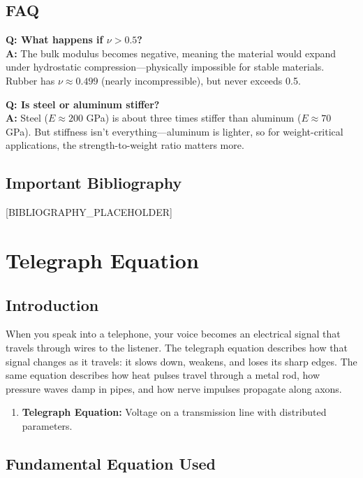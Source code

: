 \documentclass[11pt,openright]{book}
\begin{document}
\section*{FAQ}

\textbf{Q: What happens if $\nu > 0.5$?}\\
\textbf{A:} The bulk modulus becomes negative, meaning the material would expand under hydrostatic compression---physically impossible for stable materials. Rubber has $\nu \approx 0.499$ (nearly incompressible), but never exceeds 0.5.

\textbf{Q: Is steel or aluminum stiffer?}\\
\textbf{A:} Steel ($E \approx 200$ GPa) is about three times stiffer than aluminum ($E \approx 70$ GPa). But stiffness isn't everything---aluminum is lighter, so for weight-critical applications, the strength-to-weight ratio matters more.
\section*{Important Bibliography}

[BIBLIOGRAPHY_PLACEHOLDER]


\chapter{Telegraph Equation}

\section*{Introduction}

When you speak into a telephone, your voice becomes an electrical signal that travels through wires to the listener. The telegraph equation describes how that signal changes as it travels: it slows down, weakens, and loses its sharp edges. The same equation describes how heat pulses travel through a metal rod, how pressure waves damp in pipes, and how nerve impulses propagate along axons.

\begin{enumerate}
\item \textbf{Telegraph Equation:} Voltage on a transmission line with distributed parameters.

\end{enumerate}
\section*{Fundamental Equation Used}
\end{document}
